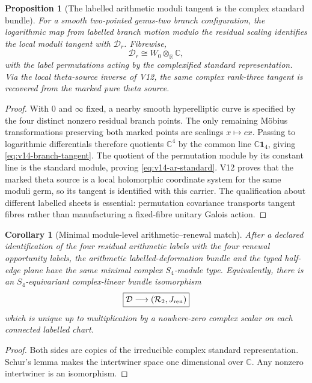 \documentclass[11pt]{article}
\newtheorem{proposition}[proposition]{Proposition}
\newtheorem{corollary}[corollary]{Corollary}
\theoremstyle{definition}
\theoremstyle{remark}
\newcommand{\C}{\mathbb C}
\newcommand{\R}{\mathbb R}
\newcommand{\one}{\mathbf1}
\begin{document}
\begin{proposition}[The labelled arithmetic moduli tangent is the complex standard bundle]
\label{prop:v14-branch-standard}
For a smooth two-pointed genus-two branch configuration, the logarithmic map
from labelled branch motion modulo the residual scaling identifies the local
moduli tangent with $\mathcal D_r$.  Fibrewise,
\[
 \boxed{\mathcal D_r\cong W_0\otimes_\R\C,}
 \label{eq:v14-ar-standard}
\]
with the label permutations acting by the complexified standard
representation.  Via the local theta-source inverse of V12, the same complex
rank-three tangent is recovered from the marked pure theta source.
\end{proposition}

\begin{proof}
With $0$ and $\infty$ fixed, a nearby smooth hyperelliptic curve is specified
by the four distinct nonzero residual branch points.  The only remaining
M\"obius transformations preserving both marked points are scalings
$x\mapsto cx$.  Passing to logarithmic differentials therefore quotients
$\C^4$ by the common line $\C\one_4$, giving
\eqref{eq:v14-branch-tangent}.  The quotient of the permutation module by its
constant line is the standard module, proving
\eqref{eq:v14-ar-standard}.  V12 proves that the marked theta source is a
local holomorphic coordinate system for the same moduli germ, so its tangent
is identified with this carrier.  The qualification about different labelled
sheets is essential: permutation covariance transports tangent fibres rather
than manufacturing a fixed-fibre unitary Galois action.
\end{proof}

\begin{corollary}[Minimal module-level arithmetic--renewal match]
\label{cor:v14-module-match}
After a declared identification of the four residual arithmetic labels with
the four renewal opportunity labels, the arithmetic labelled-deformation
bundle and the typed half-edge plane have the same minimal complex
$S_4$-module type.  Equivalently, there is an $S_4$-equivariant complex-linear
bundle isomorphism
\[
 \boxed{
 \mathcal D\longrightarrow(\mathcal R_2,J_{\rm ren})}
 \]
which is unique up to multiplication by a nowhere-zero complex scalar on each
connected labelled chart.
\end{corollary}

\begin{proof}
Both sides are copies of the irreducible complex standard representation.
Schur's lemma makes the intertwiner space one dimensional over $\C$.  Any
nonzero intertwiner is an isomorphism.
\end{proof}
\end{document}
